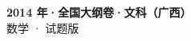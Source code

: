 \documentclass[zihao=-4, a4paper]{ctexart}
\begin{document}
\begin{center}
  {\Large\bfseries 2014 年·全国大纲卷·文科（广西）}\\[4pt]
  {\large 数学 · 试题版}
\end{center}
\medskip
{}

\end{document}
